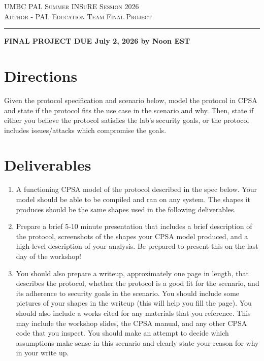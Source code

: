 \documentclass[12pt]{article}
\begin{document}
\noindent
{\scshape UMBC PAL} \hfill {\scshape Summer INSuRE Session 2026} \\
{\scshape Author - PAL Education Team } \hfill {\scshape Final Project}

 
\smallskip
\hrule
\bigskip

\begin{center}
{\large \textbf{FINAL PROJECT DUE July 2, 2026 by Noon EST}}
\end{center}

\section{Directions}

Given the protocol specification and scenario below, model the protocol in CPSA and state if the protocol fits the use case in the scenario and why. 
Then, state if either you believe the protocol satisfies the lab's security goals, or the protocol includes issues/attacks which compromise the goals. 

\section{Deliverables}
\begin{enumerate}
    \item A functioning CPSA model of the protocol described in the spec below. Your model should be able to be compiled and ran on any system. The shapes it produces should be the same shapes used in the following deliverables.
    \item Prepare a brief 5-10 minute presentation that includes a brief description of the protocol, screenshots of the shapes your CPSA model produced, and a high-level description of your analysis. 
    Be prepared to present this on the last day of the workshop!
    \item You should also prepare a writeup, approximately one page in length, that describes the protocol, whether the protocol is a good fit for the scenario, and its adherence to security goals in the scenario.
You should include some pictures of your shapes in the writeup (this will help you fill the page).
You should also include a works cited for any materials that you reference. This may include the workshop slides, the CPSA manual, and any other CPSA code that you inspect.
You should make an attempt to decide which assumptions make sense in this scenario and clearly state your reason for why in your write up.
\end{enumerate}
\end{document}
